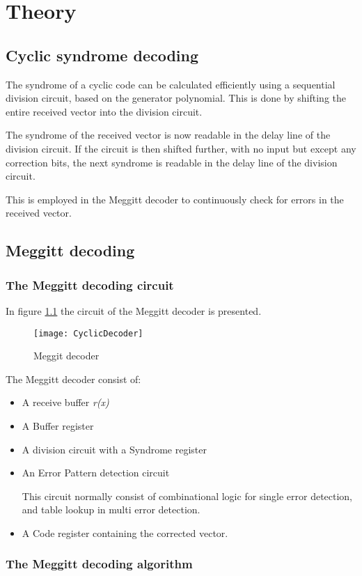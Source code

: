 \documentclass[MiniProjectMain]{subfiles}
\begin{document}
\chapter{Theory}

\section{Cyclic syndrome decoding}
The syndrome of a cyclic code can be calculated efficiently using a sequential division circuit, based on the generator polynomial.
This is done by shifting the entire received vector into the division circuit.

The syndrome of the received vector is now readable in the delay line of the division circuit.
If the circuit is then shifted further, with no input but except any correction bits, the next syndrome is readable in the delay line of the division circuit.

This is employed in the Meggitt decoder to continuously check for errors in the received vector.

\newpage
\section{Meggitt decoding}

\subsection{The Meggitt decoding circuit}
In figure \ref{fig:CyclicDecoder} the circuit of the Meggitt decoder is presented.


\begin{figure}[H]
\begin{center}
\texttt{[image: CyclicDecoder]}
\caption{Meggit decoder}
\label{fig:CyclicDecoder}
\end{center}
\end{figure}

The Meggitt decoder consist of:
\begin{itemize}
\item
A receive buffer \textit{r(x)}

\item
A Buffer register

\item
A division circuit with a Syndrome register

\item
An Error Pattern detection circuit

\subitem This circuit normally consist of combinational logic for single error detection, and table lookup in multi error detection.

\item
A Code register containing the corrected vector.

\end{itemize}

\subsection{The Meggitt decoding algorithm}
\end{document}
